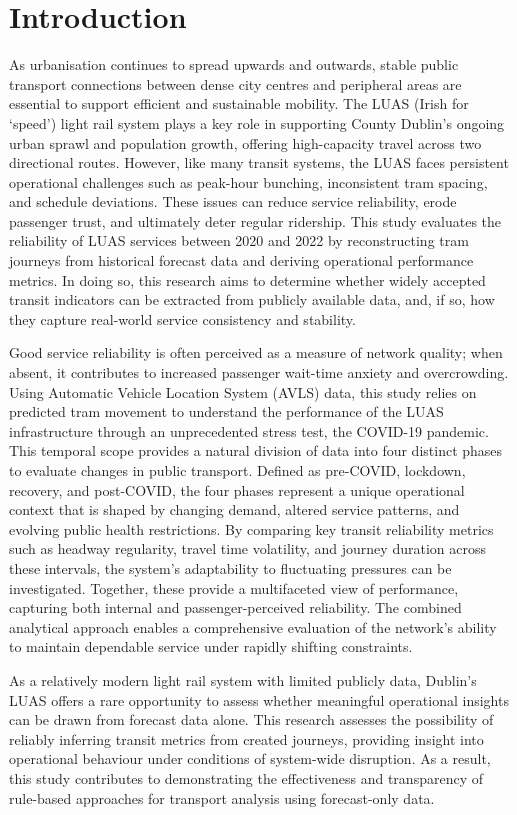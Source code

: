 \section*{Introduction}

As urbanisation continues to spread upwards and outwards, stable public transport connections between dense city centres and peripheral areas are essential to support efficient and sustainable mobility. The LUAS (Irish for ‘speed’) light rail system plays a key role in supporting County Dublin’s ongoing urban sprawl and population growth, offering high-capacity travel across two directional routes. However, like many transit systems, the LUAS faces persistent operational challenges such as peak-hour bunching, inconsistent tram spacing, and schedule deviations. These issues can reduce service reliability, erode passenger trust, and ultimately deter regular ridership. This study evaluates the reliability of LUAS services between 2020 and 2022 by reconstructing tram journeys from historical forecast data and deriving operational performance metrics. In doing so, this research aims to determine whether widely accepted transit indicators can be extracted from publicly available data, and, if so, how they capture real-world service consistency and stability.

Good service reliability is often perceived as a measure of network quality; when absent, it contributes to increased passenger wait-time anxiety and overcrowding. Using Automatic Vehicle Location System (AVLS) data, this study relies on predicted tram movement to understand the performance of the LUAS infrastructure through an unprecedented stress test, the COVID-19 pandemic. This temporal scope provides a natural division of data into four distinct phases to evaluate changes in public transport. Defined as pre-COVID, lockdown, recovery, and post-COVID, the four phases represent a unique operational context that is shaped by changing demand, altered service patterns, and evolving public health restrictions. By comparing key transit reliability metrics such as headway regularity, travel time volatility, and journey duration across these intervals, the system’s adaptability to fluctuating pressures can be investigated. Together, these provide a multifaceted view of performance, capturing both internal and passenger-perceived reliability. The combined analytical approach enables a comprehensive evaluation of the network’s ability to maintain dependable service under rapidly shifting constraints.

As a relatively modern light rail system with limited publicly data, Dublin's LUAS offers a rare opportunity to assess whether meaningful operational insights can be drawn from forecast data alone. This research assesses the possibility of reliably inferring transit metrics from created journeys, providing insight into operational behaviour under conditions of system-wide disruption. As a result, this study contributes to demonstrating the effectiveness and transparency of rule-based approaches for transport analysis using forecast-only data.
